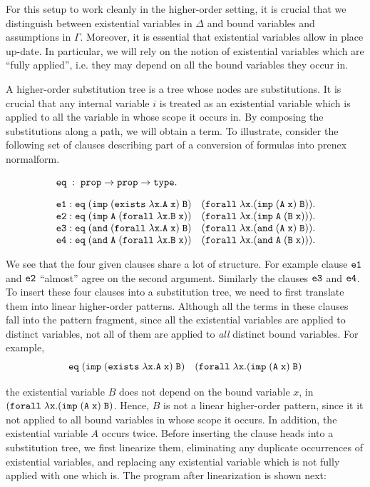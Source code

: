 \documentclass{acmconf}
\newcommand{\typeLF}{\tt{type}}
\newcommand{\propLF}{\tt{prop}}
\newcommand{\andLF}{\tt{and}\;}
\newcommand{\impLF}{\tt{imp}\;}
\newcommand{\forallLF}{\tt{forall}\;}
\newcommand{\existsLF}{\tt{exists}\;}
\newcommand{\eqLF}{\tt{eq}\;}
\newcommand{\eqilLF}{\tt{e1}}
\newcommand{\eqirLF}{\tt{e2}}
\newcommand{\eqalLF}{\tt{e3}}
\newcommand{\eqarLF}{\tt{e4}}
\begin{document}
For this setup to work cleanly in the higher-order
setting, it is crucial that we distinguish between existential
variables in $\Delta$ and bound variables and assumptions in
$\Gamma$. Moreover, it is essential that existential variables allow
in place up-date. In particular, we will rely on the notion of
existential variables which are ``fully applied'', i.e. they may
depend on all the bound variables they occur in.

A higher-order substitution tree is a tree whose
nodes are substitutions. It is crucial that any internal variable $i$
is treated as an existential variable which is applied to all the
variable in whose scope it occurs in. By composing the substitutions along a path,
we will obtain a term. To illustrate, consider the following
set of clauses describing part of a conversion of formulas into prenex
normalform. 

\begin{small}
\[
\begin{array}{l}
\eqLF :\;  \propLF \rightarrow \propLF \rightarrow \typeLF.\\[1em]
%
\eqilLF: \eqLF (\impLF (\existsLF \lambda x. A\; x)\; B)\quad (\forallLF \lambda x. (\impLF (A\; x)\; B)).\\
\eqirLF: \eqLF (\impLF A\; (\forallLF \lambda x. B\;x)) \quad (\forallLF \lambda x. (\impLF A \; (B\; x))).\\
\eqalLF: \eqLF (\andLF (\forallLF \lambda x. A \;x) \; B)\quad (\forallLF \lambda x. (\andLF (A\; x)\; B)).\\
\eqarLF: \eqLF (\andLF A \; (\forallLF \lambda x. B\; x)) \quad (\forallLF \lambda x. (\andLF A \; (B\;x))).\\
\end{array}
\]
\end{small}

We see that the four given clauses share a lot of structure. For
example clause $\eqilLF$ and $\eqirLF$ ``almost'' agree on the second
argument. Similarly the clauses $\eqalLF$ and $\eqarLF$. To insert
these four clauses into a substitution tree, we need to first
translate them into linear higher-order patterns. Although all the
terms in these clauses fall into the pattern fragment, since all the
existential variables are applied to distinct variables, not all of
them are applied to {\em{all}} distinct bound variables. For example, 
\[
\eqLF (\impLF (\existsLF \lambda x. A\; x)\; B)\quad (\forallLF
\lambda x. (\impLF (A\; x)\; B)
\]

the existential variable $B$ does not depend on the bound variable
$x$, in $(\forallLF \lambda x. (\impLF (A\; x)\; B)$. Hence, $B$ is
not a linear higher-order pattern, since it it not applied to all
bound variables in whose scope it occurs. In addition, the existential
variable $A$ occurs twice. Before inserting the clause heads into a
substitution tree, we first linearize them, eliminating any duplicate
occurrences of existential variables, and replacing any existential
variable which is not fully applied with one which is. The program after
linearization is shown next:
\end{document}
